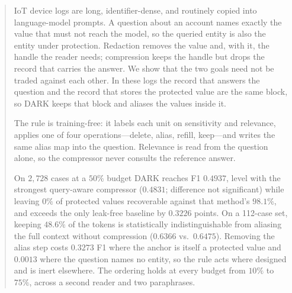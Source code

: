 \begin{abstract}
IoT device logs are long, identifier-dense, and routinely copied into language-model
prompts. A question about an account names exactly the value that must not reach the model,
so the queried entity is also the entity under protection. Redaction removes the value and,
with it, the handle the reader needs; compression keeps the handle but drops the record that
carries the answer. We show that the two goals need not be traded against each other. In
these logs the record that answers the question and the record that stores the protected
value are the same block, so \textsc{DARK} keeps that block and aliases the values inside it.

The rule is training-free: it labels each unit on sensitivity and relevance, applies
one of four operations---delete, alias, refill, keep---and writes the same alias map
into the question. Relevance is read from the question alone, so the compressor never
consults the reference answer.

On $2{,}728$ cases at a $50\%$ budget \textsc{DARK} reaches F1 $0.4937$, level with the
strongest query-aware compressor ($0.4831$; difference not significant) while leaving $0\%$
of protected values recoverable against that method's $98.1\%$, and exceeds the only leak-free
baseline by $0.3226$ points. On a 112-case set, keeping $48.6\%$ of the tokens is
statistically indistinguishable from aliasing the full context without compression ($0.6366$
vs.\ $0.6475$). Removing the alias step costs $0.3273$ F1 where the anchor is itself a
protected value and $0.0013$ where the question names no entity, so the rule acts where designed
and is inert elsewhere. The ordering holds at every budget from $10\%$ to $75\%$,
across a second reader and two paraphrases.
\end{abstract}
